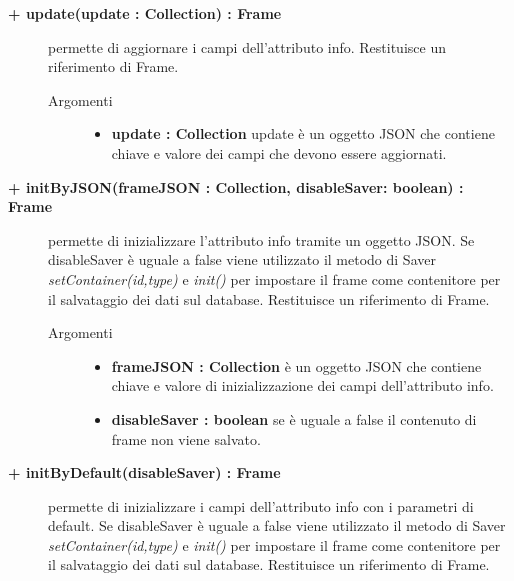 \begin{description}
\begin{description}
		\item[\textbf{\color{blue}+ update(update : Collection) : Frame			}] \hfill
			permette di aggiornare i campi dell'attributo info. Restituisce un riferimento di Frame.
			
		\begin{description}
			\item[Argomenti] \hfill
				\begin{itemize}
				
					\item \textbf{update : Collection			} \hfill
					update è un oggetto JSON che contiene chiave e valore dei campi che devono essere aggiornati. 
				\end{itemize}
		\end{description}

\end{description}

\begin{description}
		\item[\textbf{\color{blue}+ initByJSON(frameJSON : Collection, disableSaver: boolean) : Frame			}] \hfill
			permette di inizializzare l'attributo info tramite un oggetto JSON. Se disableSaver è uguale a false viene utilizzato il metodo di Saver \textit{setContainer(id,type)} e \textit{init()} per impostare il frame come contenitore per il salvataggio dei dati sul database. Restituisce un riferimento di Frame.
			
		\begin{description}
			\item[Argomenti] \hfill
				\begin{itemize}
				
					\item \textbf{frameJSON : Collection			} \hfill
					è un oggetto JSON che contiene chiave e valore di inizializzazione dei campi dell'attributo info. 
					\item \textbf{disableSaver : boolean			} \hfill
					se è uguale a false il contenuto di frame non viene salvato.  				
				\end{itemize}
		\end{description}

\end{description}

\begin{description}
		\item[\textbf{\color{blue}+ initByDefault(disableSaver) : Frame			}] \hfill
			permette di inizializzare i campi dell'attributo info con i parametri di default. Se disableSaver è uguale a false viene utilizzato il metodo di Saver \textit{setContainer(id,type)} e \textit{init()} per impostare il frame come contenitore per il salvataggio dei dati sul database. Restituisce un riferimento di Frame.


\end{description}
\end{description}
